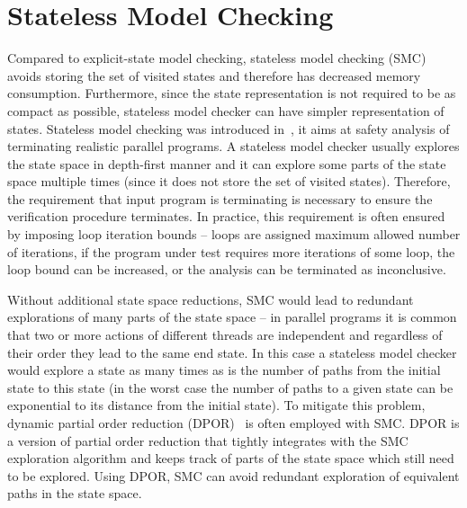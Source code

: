 
\section{Stateless Model Checking}


Compared to explicit-state model checking, stateless model checking (SMC)
avoids storing the set of visited states and therefore has decreased memory
consumption.
Furthermore, since the state representation is not required to be as compact as
possible, stateless model checker can have simpler representation of states.
Stateless model checking was introduced in~\cite{Godefroid1997}, it aims at
safety analysis of terminating realistic parallel programs.
A stateless model checker usually explores the state space in depth-first
manner and it can explore some parts of the state space multiple times (since
it does not store the set of visited states).
Therefore, the requirement that input program is terminating is necessary to
ensure the verification procedure terminates.
In practice, this requirement is often ensured by imposing loop iteration
bounds -- loops are assigned maximum allowed number of iterations, if the
program under test requires more iterations of some loop, the loop bound can be
increased, or the analysis can be terminated as inconclusive.

Without additional state space reductions, SMC would lead to redundant
explorations of many parts of the state space -- in parallel programs it is
common that two or more actions of different threads are independent and
regardless of their order they lead to the same end state.
In this case a stateless model checker would explore a state as many times as
is the number of paths from the initial state to this state (in the worst case
the number of paths to a given state can be exponential to its distance from
the initial state).
To mitigate this problem, dynamic partial order reduction
(DPOR)~\cite{Flanagan2005dpor} is often employed with SMC.
DPOR is a version of partial order reduction that tightly integrates with
the SMC exploration algorithm and keeps track of parts of the state space which
still need to be explored.
Using DPOR, SMC can avoid redundant exploration of equivalent paths in the
state space.

